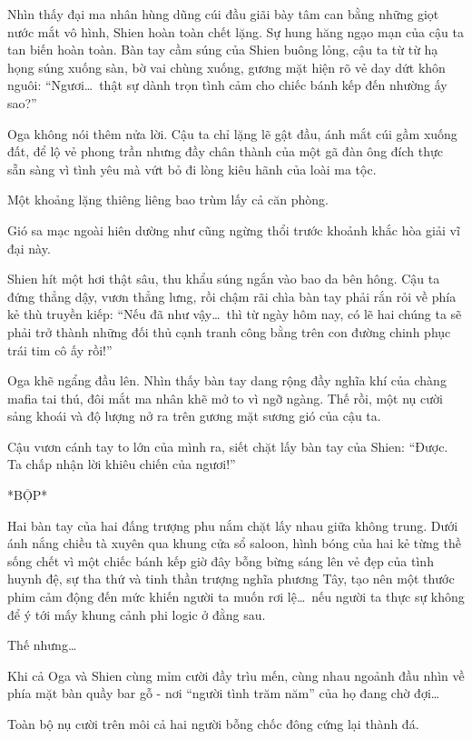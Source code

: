 \documentclass[../main.tex]{subfiles}
\begin{document}
Nhìn thấy đại ma nhân hùng dũng cúi đầu giãi bày tâm can bằng những giọt nước mắt vô hình, Shien hoàn toàn chết lặng. Sự hung hăng ngạo mạn của cậu ta tan biến hoàn toàn. Bàn tay cầm súng của Shien buông lỏng, cậu ta từ từ hạ họng súng xuống sàn, bờ vai chùng xuống, gương mặt hiện rõ vẻ day dứt khôn nguôi: ``Ngươi\dots\ thật sự dành trọn tình cảm cho chiếc bánh kếp đến nhường ấy sao?''

Oga không nói thêm nửa lời. Cậu ta chỉ lặng lẽ gật đầu, ánh mắt cúi gầm xuống đất, để lộ vẻ phong trần nhưng đầy chân thành của một gã đàn ông đích thực sẵn sàng vì tình yêu mà vứt bỏ đi lòng kiêu hãnh của loài ma tộc.

Một khoảng lặng thiêng liêng bao trùm lấy cả căn phòng.

Gió sa mạc ngoài hiên dường như cũng ngừng thổi trước khoảnh khắc hòa giải vĩ đại này.

Shien hít một hơi thật sâu, thu khẩu súng ngắn vào bao da bên hông. Cậu ta đứng thẳng dậy, vươn thẳng lưng, rồi chậm rãi chìa bàn tay phải rắn rỏi về phía kẻ thù truyền kiếp: ``Nếu đã như vậy\dots\ thì từ ngày hôm nay, có lẽ hai chúng ta sẽ phải trở thành những đối thủ cạnh tranh công bằng trên con đường chinh phục trái tim cô ấy rồi!''

Oga khẽ ngẩng đầu lên. Nhìn thấy bàn tay dang rộng đầy nghĩa khí của chàng mafia tai thú, đôi mắt ma nhân khẽ mở to vì ngỡ ngàng. Thế rồi, một nụ cười sảng khoái và độ lượng nở ra trên gương mặt sương gió của cậu ta.

Cậu vươn cánh tay to lớn của mình ra, siết chặt lấy bàn tay của Shien: ``Được. Ta chấp nhận lời khiêu chiến của ngươi!''

*BỘP*

Hai bàn tay của hai đấng trượng phu nắm chặt lấy nhau giữa không trung. Dưới ánh nắng chiều tà xuyên qua khung cửa sổ saloon, hình bóng của hai kẻ từng thề sống chết vì một chiếc bánh kếp giờ đây bỗng bừng sáng lên vẻ đẹp của tình huynh đệ, sự tha thứ và tinh thần trượng nghĩa phương Tây, tạo nên một thước phim cảm động đến mức khiến người ta muốn rơi lệ\dots\ nếu người ta thực sự không để ý tới mấy khung cảnh phi logic ở đằng sau.


Thế nhưng\dots

Khi cả Oga và Shien cùng mỉm cười đầy trìu mến, cùng nhau ngoảnh đầu nhìn về phía mặt bàn quầy bar gỗ - nơi ``người tình trăm năm'' của họ đang chờ đợi\dots

Toàn bộ nụ cười trên môi cả hai người bỗng chốc đông cứng lại thành đá.
\end{document}
